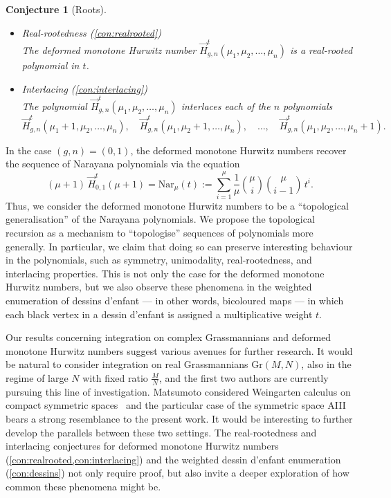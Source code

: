 \documentclass[a4paper]{article}
\theoremstyle{plain}
\newtheorem{conjecturex}[theoremx]{Conjecture}
\numberwithin{theorem}{section}
\theoremstyle{definition}
\theoremstyle{remark}
\newcommand{\HN}[3]{\vec{H}^t_{#1,#2}(#3)}
\begin{document}
\begin{conjecturex}[Roots] ~
\begin{itemize}
\item {\em Real-rootedness} (\cref{con:realrooted}) \\ The deformed monotone Hurwitz number $\HN{g}{n}{\mu_1, \mu_2, \ldots, \mu_n}$ is a real-rooted polynomial in $t$.

\item {\em Interlacing} (\cref{con:interlacing}) \\ The polynomial $\HN{g}{n}{\mu_1, \mu_2, \ldots, \mu_n}$ interlaces each of the $n$ polynomials
\[
\HN{g}{n}{\mu_1+1, \mu_2, \ldots, \mu_n}, \quad \HN{g}{n}{\mu_1, \mu_2+1, \ldots, \mu_n}, \quad \ldots, \quad \HN{g}{n}{\mu_1, \mu_2, \ldots, \mu_n+1}.
\]
\end{itemize}
\end{conjecturex}


In the case $(g,n) = (0,1)$, the deformed monotone Hurwitz numbers recover the sequence of Narayana polynomials via the equation
\begin{equation} \label{eq:hurwitznarayana} 
(\mu+1) \, \HN{0}{1}{\mu+1} = \mathrm{Nar}_{\mu}(t) := \sum_{i=1}^{\mu} \frac{1}{\mu} \binom{\mu}{i} \binom{\mu}{i-1} \, t^i.
\end{equation}
Thus, we consider the deformed monotone Hurwitz numbers to be a ``topological generalisation'' of the Narayana polynomials. We propose the topological recursion as a mechanism to ``topologise'' sequences of polynomials more generally. In particular, we claim that doing so can preserve interesting behaviour in the polynomials, such as symmetry, unimodality, real-rootedness, and interlacing properties. This is not only the case for the deformed monotone Hurwitz numbers, but we also observe these phenomena in the weighted enumeration of dessins d'enfant --- in other words, bicoloured maps --- in which each black vertex in a dessin d'enfant is assigned a multiplicative weight $t$.


Our results concerning integration on complex Grassmannians and deformed monotone Hurwitz numbers suggest various avenues for further research. It would be natural to consider integration on real Grassmannians $\mathrm{Gr}(M,N)$, also in the regime of large $N$ with fixed ratio $\frac{M}{N}$, and the first two authors are currently pursuing this line of investigation. Matsumoto considered Weingarten calculus on compact symmetric spaces~\cite{mat13} and the particular case of the symmetric space AIII bears a strong resemblance to the present work. It would be interesting to further develop the parallels between these two settings. The real-rootedness and interlacing conjectures for deformed monotone Hurwitz numbers (\cref{con:realrooted,con:interlacing}) and the weighted dessin d'enfant enumeration (\cref{con:dessins}) not only require proof, but also invite a deeper exploration of how common these phenomena might be.
\end{document}
